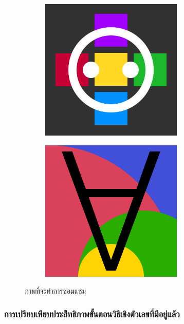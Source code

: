 \documentclass[hidelinks, a4paper,12pt]{article}
\numberwithin{equation}{section}							%
\numberwithin{equation}{section}
\begin{document}
{\begin{figure}[H]
\begin{subfigure}{0.4\linewidth}
			\includegraphics[width=0.8\linewidth]{images/image_inpaint_synthetic/case04-toinpaint.png}		
		\end{subfigure}
		\begin{subfigure}{0.4\linewidth}
			\centering
			\includegraphics[width=0.8\linewidth]{images/image_inpaint_synthetic/case05-toinpaint.png}		
		\end{subfigure}
		\caption{ภาพที่จะทำการซ่อมแซม}
	\end{figure}
	\subsubsection{การเปรียบเทียบประสิทธิภาพขั้นตอนวิธีเชิงตัวเลขที่มีอยู่แล้ว}
	
}
\end{document}
